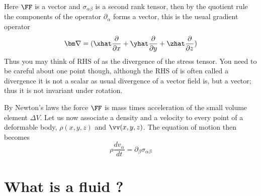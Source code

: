 \documentclass{tufte-book} %
\begin{document}
%
Here $\FF$ is a vector and $\sigma_{\alpha\beta}$ is a second rank
tensor, then by the quotient rule the components of the operator
$\partial_{\alpha}$ forms a vector, this is the usual gradient
operator 
\begin{equation}
{\bm \nabla} = (\xhat\frac{\partial}{\partial x}+\yhat\frac{\partial}{\partial y}+\zhat\frac{\partial}{\partial z} ) 
\end{equation}
Thus you may think of RHS of  as the divergence of the
stress tensor. You need to be careful about one point though, although
the RHS of  is often called a divergence it is not a
scalar as usual divergence of a vector field is, but a vector; thus it
is not invariant under rotation. 

By Newton's laws the force $\FF$ is mass times acceleration of the
small volume element $\Delta V$. Let us now associate a density and a
velocity to every point of a deformable body, $\rho(x,y,z)$ and 
$\vv(x,y,z)$.  The equation of motion then becomes
\begin{equation}
\boxed{
\rho\frac{dv_{\alpha}}{dt} = \partial_{\beta}\sigma_{\alpha\beta}
}
\end{equation}

\section{What is a fluid ?}
\end{document}
